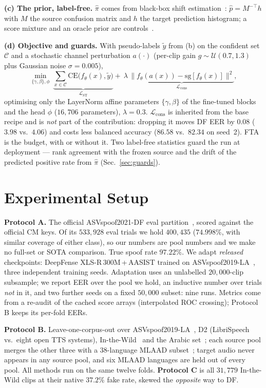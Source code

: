 \documentclass[10pt,letterpaper]{article}
\begin{document}
\textbf{(c) The prior, label-free.} $\hat\pi$ comes from black-box shift
estimation~\cite{bbse}: $\hat p = M^{-\top}h$ with $M$ the source confusion
matrix and $h$ the target prediction histogram; a score mixture and an oracle
prior are controls~\cite{sld}.

\textbf{(d) Objective and guards.} With pseudo-labels $\tilde y$ from (b) on the
confident set $\mathcal{C}$ and a stochastic channel perturbation $a(\cdot)$
(per-clip gain $g\sim\mathcal U(0.7,1.3)$ plus Gaussian noise $\sigma{=}0.005$),
\begin{equation}
\min_{\{\gamma,\beta\},\phi}\
\underbrace{\textstyle\sum_{x\in\mathcal C}\!\mathrm{CE}\big(f_\theta(x),\tilde y\big)}_{\mathcal L_{\mathrm{ST}}}
+\ \lambda\,\underbrace{\big\|f_\theta(a(x))-\mathrm{sg}[f_\theta(x)]\big\|^2}_{\mathcal L_{\mathrm{cons}}},
\end{equation}
optimising only the LayerNorm affine parameters $\{\gamma,\beta\}$ of the
fine-tuned blocks and the head $\phi$ ($16{,}706$ parameters), $\lambda{=}0.3$.
$\mathcal L_{\mathrm{cons}}$ is inherited from the base recipe and is \emph{not}
part of the contribution: dropping it moves DF EER by $0.08$ ($3.98$ vs.\
$4.06$) and costs less balanced accuracy ($86.58$ vs.\ $82.34$ on seed~2). FTA
is the budget, with or without it. Two
label-free statistics guard the run at deployment --- rank agreement with the
frozen source and the drift of the predicted positive rate from $\hat\pi$
(Sec.~\ref{sec:guards}).

\section{Experimental Setup}
\textbf{Protocol A.} The official ASVspoof2021-DF eval partition~\cite{asvspoof21}, scored against
the official CM keys. Of its $533{,}928$ eval trials we hold $400{,}435$
($74.998\%$, with similar coverage of either class), so our numbers are pool
numbers and we make no full-set or SOTA comparison. True spoof rate $97.22\%$.
We adapt \emph{released} checkpoints: DeepFense
XLS-R\,300M\,+\,AASIST trained on ASVspoof2019-LA~\cite{deepfensehf}, three
independent training seeds. Adaptation uses an unlabelled $20{,}000$-clip subsample; we report EER over the
pool we hold, an inductive number over trials \emph{not} in it, and two further
seeds on a fixed $50{,}000$ subset: nine runs. Metrics come from a re-audit of the cached score
arrays (interpolated ROC crossing); Protocol B keeps its per-fold EERs.

\textbf{Protocol B.} Leave-one-corpus-out over ASVspoof2019-LA~\cite{asvspoof19},
D2 (LibriSpeech vs.\ eight open TTS systems), In-the-Wild~\cite{itw} and the
Arabic set~\cite{arad}; each source pool merges the other three with a
38-language MLAAD subset~\cite{mlaad}; target audio never appears in any source
pool, and six MLAAD languages are held out of every pool. All methods run
on the same twelve folds. \textbf{Protocol C} is all $31{,}779$ In-the-Wild clips
at their native $37.2\%$ fake rate, skewed the \emph{opposite} way to DF.
\end{document}
